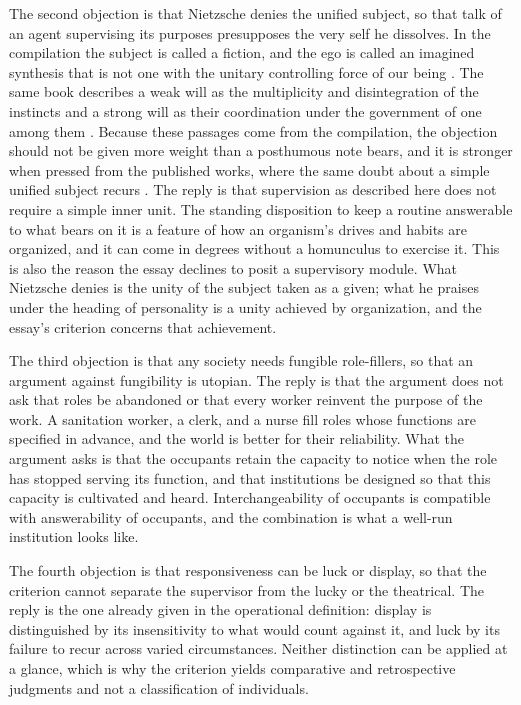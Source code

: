 \documentclass[11pt]{article}
\begin{document}
The second objection is that Nietzsche denies the unified subject, so that talk of an agent supervising its purposes presupposes the very self he dissolves. In the compilation the subject is called a fiction, and the ego is called an imagined synthesis that is not one with the unitary controlling force of our being \cite[Aphs.\ 370--71]{wtp1}. The same book describes a weak will as the multiplicity and disintegration of the instincts and a strong will as their coordination under the government of one among them \cite[Aph.\ 46]{wtp1}. Because these passages come from the compilation, the objection should not be given more weight than a posthumous note bears, and it is stronger when pressed from the published works, where the same doubt about a simple unified subject recurs \cite[Secs.\ 12, 17, and 19]{bge}. The reply is that supervision as described here does not require a simple inner unit. The standing disposition to keep a routine answerable to what bears on it is a feature of how an organism's drives and habits are organized, and it can come in degrees without a homunculus to exercise it. This is also the reason the essay declines to posit a supervisory module. What Nietzsche denies is the unity of the subject taken as a given; what he praises under the heading of personality is a unity achieved by organization, and the essay's criterion concerns that achievement.

The third objection is that any society needs fungible role-fillers, so that an argument against fungibility is utopian. The reply is that the argument does not ask that roles be abandoned or that every worker reinvent the purpose of the work. A sanitation worker, a clerk, and a nurse fill roles whose functions are specified in advance, and the world is better for their reliability. What the argument asks is that the occupants retain the capacity to notice when the role has stopped serving its function, and that institutions be designed so that this capacity is cultivated and heard. Interchangeability of occupants is compatible with answerability of occupants, and the combination is what a well-run institution looks like.

The fourth objection is that responsiveness can be luck or display, so that the criterion cannot separate the supervisor from the lucky or the theatrical. The reply is the one already given in the operational definition: display is distinguished by its insensitivity to what would count against it, and luck by its failure to recur across varied circumstances. Neither distinction can be applied at a glance, which is why the criterion yields comparative and retrospective judgments and not a classification of individuals.
\end{document}
